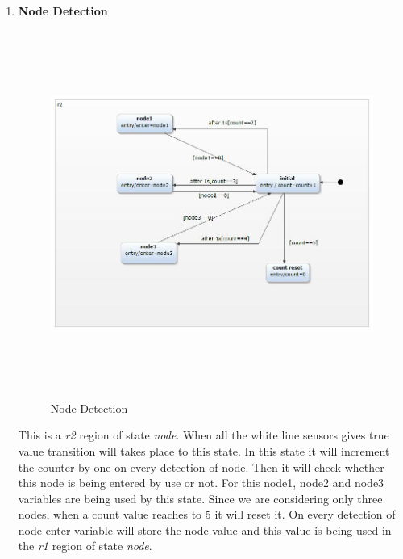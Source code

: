 \documentclass[a4paper,12pt,oneside]{article}
\begin{document}
\begin{enumerate}
 
\item \textbf{Node Detection}\\
\begin{figure}[H]
\centering
\includegraphics[width=15cm,height=12cm]{5.jpg}
\caption{Node Detection}
\end{figure}
This is a \emph{r2} region of state \emph{node}. When all the white line sensors gives true value transition will takes place to this state. In this state it will increment the counter by one on every detection of node. Then it will check whether this node is being entered by use or not. For this node1, node2 and node3 variables are being used by this state.
Since we are considering only three nodes, when a count value reaches to 5 it will reset it. On every detection of node enter variable will store the node value and this value is being used in the \emph{r1} region of state \emph{node}.\\
\newpage


\end{enumerate}
\end{document}
